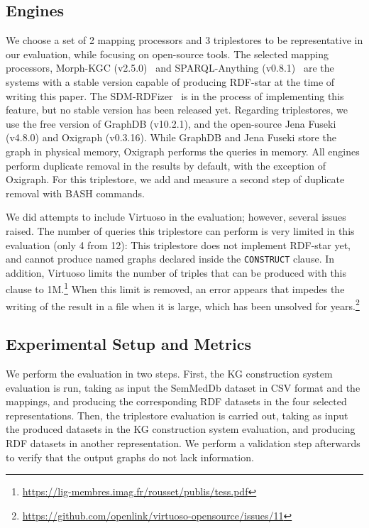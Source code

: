 \subsection{Engines}
\label{sec:chp6-1_engines}
We choose a set of 2 mapping processors and 3 triplestores to be representative in our evaluation, while focusing on open-source tools. The selected mapping processors, Morph-KGC (v2.5.0)~\parencite{arenas2022morphkgc} and SPARQL-Anything (v0.8.1)~\parencite{asprino2023sparql-anything} are the systems with a stable version capable of producing RDF-star at the time of writing this paper. The SDM-RDFizer~\parencite{iglesias2020rdfizer} is in the process of implementing this feature, but no stable version has been released yet. Regarding triplestores, we use the free version of GraphDB (v10.2.1), and the open-source Jena Fuseki (v4.8.0) and Oxigraph (v0.3.16). While GraphDB and Jena Fuseki store the graph in physical memory, Oxigraph performs the queries in memory. All engines perform duplicate removal in the results by default, with the exception of Oxigraph. For this triplestore, we add and measure a second step of duplicate removal with BASH commands.


We did attempts to include Virtuoso in the evaluation; however, several issues raised. The number of queries this triplestore can perform is very limited in this evaluation (only 4 from 12): This triplestore
does not implement RDF-star yet, and cannot produce named graphs declared inside the \texttt{CONSTRUCT} clause. In addition, Virtuoso limits the number of triples that can be produced with this clause to 1M.\footnote{\url{https://lig-membres.imag.fr/rousset/publis/tess.pdf}} When this limit is removed, an error appears that impedes the writing of the result in a file when it is large, which has been unsolved for years.\footnote{\url{https://github.com/openlink/virtuoso-opensource/issues/11}} 




\subsection{Experimental Setup and Metrics}
\label{sec:chp6-1_exp-setup}
We perform the evaluation in two steps. First, the KG construction system evaluation is run, taking as input the SemMedDb dataset in CSV format and the mappings, and producing the corresponding RDF datasets in the four selected representations. Then, the triplestore evaluation is carried out, taking as input the produced datasets in the KG construction system evaluation, and producing RDF datasets in another representation. We perform a validation step afterwards to verify that the output graphs do not lack information.


